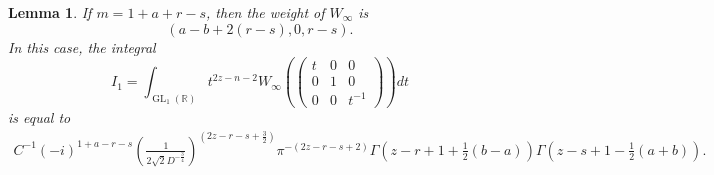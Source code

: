 \documentclass[11pt, a4paper]{amsart}
\theoremstyle{plain}
\newtheorem{lemma}[theorem]{Lemma}
\theoremstyle{definition}
\numberwithin{equation}{section}
\def\RR{\mathbb{R}}
\DeclareMathOperator{\GL}{\mathrm{GL}}
\begin{document}
\begin{lemma}
\label{Lemma: integral I1}
If $m = 1+ a + r - s$, then the weight of $W_{\infty}$ is 
\begin{equation*}
(a - b + 2(r - s), 0, r-s).
\end{equation*}
In this case, the integral 
\begin{equation*}
    I_1 = \int_{\GL_1(\RR)} t^{2z - n - 2} W_{\infty}( \begin{pmatrix}
                                                                        t & 0 & 0 \\
                                                                        0 & 1 & 0 \\
                                                                        0 & 0 & t^{-1} 
                                                                      \end{pmatrix}) dt
\end{equation*}
is equal to 
\begin{align*}
    C^{-1} (-i)^{1 + a - r - s} (\frac{1}{2\sqrt{2}D^{-\frac{3}{4}}})^{(2z -r - s + \frac{3}{2})}\pi^{-(2z - r - s + 2)}\Gamma(z - r + 1 + \frac{1}{2}(b - a)) \Gamma(z - s + 1 - \frac{1}{2} (a + b)). 
\end{align*}
    
\end{lemma}
\end{document}
